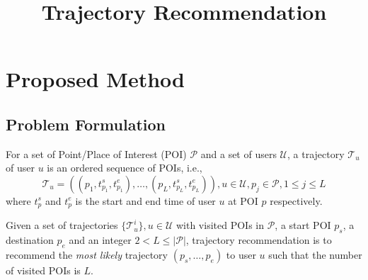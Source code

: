 \documentclass{sig-alternate-05-2015}
\begin{document}

\title{Trajectory Recommendation}


\maketitle




\section{Proposed Method}


\subsection{Problem Formulation}
\label{sec:formulation}
For a set of Point/Place of Interest (POI) $\mathcal{P}$ and a set of users $\mathcal{U}$,
a trajectory $\mathcal{T}_u$ of user $u$ is an ordered sequence of POIs,
i.e.,
\begin{displaymath}
    \mathcal{T}_u = ((p_1, t_{p_1}^s, t_{p_{1}}^e), \dots, (p_L, t_{p_L}^s, t_{p_L}^e)), 
    u \in \mathcal{U}, 
    p_j \in \mathcal{P}, 1 \le j \le L
\end{displaymath}
where $t_p^s$ and $t_p^e$ is the start and end time of user $u$ at POI $p$ respectively.

Given a set of trajectories $\{ \mathcal{T}_u^i \}, u \in \mathcal{U}$ with visited POIs in $\mathcal{P}$, 
a start POI $p_s$, a destination $p_e$ and an integer $2 < L \le |\mathcal{P}|$,
trajectory recommendation is to recommend the \textit{most likely} trajectory $(p_s, \dots, p_e)$ to user $u$ such that
the number of visited POIs is $L$.
\end{document}
